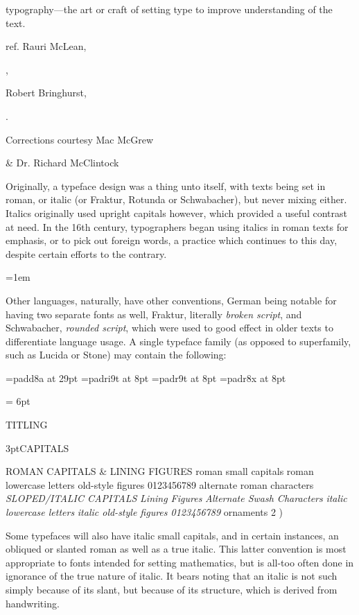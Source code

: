 {\sc typography}---the art or craft of setting type
to improve understanding of the text.

\quad ref. Rauri McLean, 

\quad{}, 

\quad Robert Bringhurst,

\quad{}.

\vfill

{Corrections courtesy Mac McGrew}

\quad \& Dr. Richard McClintock

\break
\parskip=0pt
Originally, a typeface design was a thing
unto itself, with texts being set in
roman, or italic (or Fraktur, Rotunda
or Schwabacher), but never mixing either.
Italics originally used upright capitals however,
which provided a useful contrast at
need. In the 16th century, typographers
began using italics in roman texts for
emphasis, or to pick out foreign words, a
practice which continues to this day,
despite certain efforts to the contrary.

\parindent=1em

Other languages, naturally, have other
conventions, German being notable for
having two separate fonts as well, Fraktur,
literally {\it broken script\/}, and Schwabacher,
{\it rounded script\/}, which were used to good effect in older
texts to differentiate language usage.
A single typeface family (as opposed to
superfamily, such as Lucida or Stone)
may contain the following:

\break

\font\tc=padd8a at 29pt
\font\lfi=padri9t at 8pt
\font\lf=padr9t at 8pt
\font\exp=padr8x at 8pt
{\leftskip = 6pt
\centerline {\tc TITLING}
\centerline {\tc \kern 3ptCAPITALS}
{\obeylines 
ROMAN CAPITALS
\quad \& LINING FIGURES {}
{\sc roman small capitals}
roman lowercase letters
\quad {\exp \&} old-style figures 0123456789
alternat{\alt e} roma{\alt n} characters
{\it SLOPED/ITALIC CAPITALS}
\quad {\altit \&} {\it Lining Figures} {}
{\it {\altit A}lternate {\altit S}wash {\altit C}haracters}
{\it italic lowercase letters}
\quad {\it \&} {\it italic old-style figures 0123456789}
\quad \quad {\exp \&} ornaments { 2} {)
{}
}}}

\break

Some typefaces will also have italic
small capitals, and in certain instances, an
obliqued or slanted roman as well as a true italic. 
This latter convention is most
appropriate to fonts intended for setting
mathematics, but is all-too often 
done in ignorance of the true nature of italic. 
It bears noting that
an italic is not such simply because of its
slant, but because of its structure, which is
derived from handwriting.

